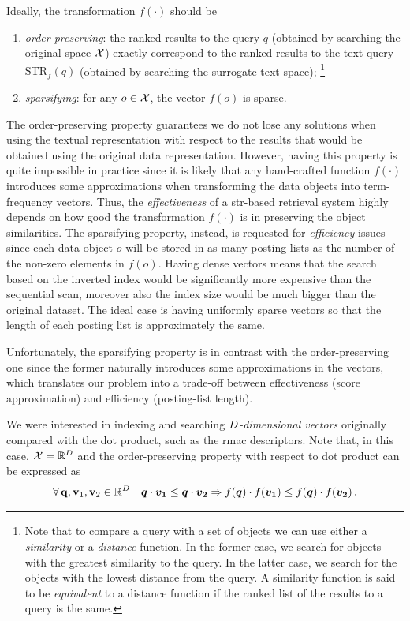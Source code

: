 Ideally, the transformation $f(\cdot)$ should be
\begin{enumerate}
    \item \emph{order-preserving}:  the ranked results to the query $q$ (obtained by searching the original space $\mathcal{X}$) exactly correspond to the ranked results to the text query $\text{STR}_f(q)$ (obtained by searching the surrogate text space);%
\footnote{Note that to compare a query with a set of objects we can use either a \emph{similarity} or a \emph{distance} function.
In the former case, we search for objects with the greatest similarity to the query.
In the latter case, we search for the objects with the lowest distance from the query. A similarity function is said to be \emph{equivalent} to a distance function if the ranked list of the results to a query is the same.}
    \item \emph{sparsifying}: for any $o \in\mathcal{X}$, the vector $f(o)$ is sparse.
\end{enumerate}

The order-preserving property guarantees we do not lose any solutions when using the textual representation with respect to the results that would be obtained using the original data representation.
However, having this property is quite impossible in practice since it is likely that any hand-crafted function $f(\cdot)$ introduces some approximations when transforming the data objects into term-frequency vectors.
Thus, the \emph{effectiveness} of a \gls{str}-based retrieval system highly depends on how good the transformation $f(\cdot)$ is in preserving the object similarities.
The sparsifying property, instead, is requested for \emph{efficiency} issues since each data object $o$ will be stored in as many posting lists as the number of the non-zero elements in $f(o)$.
Having dense vectors means that the search based on the inverted index would be significantly more expensive than the sequential scan, moreover also the index size would be much bigger than the original dataset.
The ideal case is having uniformly sparse vectors so that the length of each posting list is approximately the same.

Unfortunately, the sparsifying property is in contrast with the order-preserving one since the former naturally introduces some approximations in the vectors, which translates our problem into a trade-off between effectiveness (score approximation) and efficiency (posting-list length).

We were interested in indexing and searching \emph{${D}$-dimensional vectors} originally compared with the dot product, such as the \gls{rmac} descriptors.
Note that, in this case, $\mathcal{X}=\mathbb{R}^{{D}}$ and the order-preserving property with respect to dot product can be expressed as
\begin{equation}
\forall\, \mathbf{q},\mathbf{v}_1,\mathbf{v}_2 \in \mathbb{R}^{{D}} \quad \boldsymbol {q} \cdot \boldsymbol {v_1} \leq \boldsymbol {q} \cdot \boldsymbol {v_2} \Rightarrow f(\boldsymbol {q})\cdot f(\boldsymbol {v_1}) \leq f(\boldsymbol {q}) \cdot f(\boldsymbol {v_2}) \,.
\end{equation}

